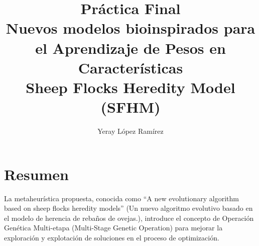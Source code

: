 

\title{
	\Huge{Práctica Final} \\\vspace{1cm}
	{Nuevos modelos bioinspirados para el Aprendizaje de Pesos en Características \vspace{1cm} \\
	Sheep Flocks Heredity Model (SFHM)}\hspace{1cm} 
 }   

\author{Yeray López Ramírez	}                             

\renewcommand*\contentsname{hola}

\makeatletter
\let\thetitle\@title
\let\theauthor\@author
\let\thedate\@date
\makeatother





\newpage %
\newcommand{\code}[1]{\colorbox{light-gray}{\textcolor{alizarin}{\texttt{#1}}}}
\newcommand{\high}[1]{\colorbox{light-gray}{\textcolor{nyellow}{\texttt{#1}}}}

\tableofcontents %

\listoffigures

\listoftables

\newpage


\section{Resumen}
La metaheurística propuesta, conocida como ``A new evolutionary algorithm based on sheep flocks heredity models'' (Un nuevo algoritmo evolutivo basado en el modelo de herencia de rebaños de ovejas.), introduce el concepto de Operación Genética Multi-etapa (Multi-Stage Genetic Operation) para mejorar la exploración y explotación de soluciones en el proceso de optimización.

